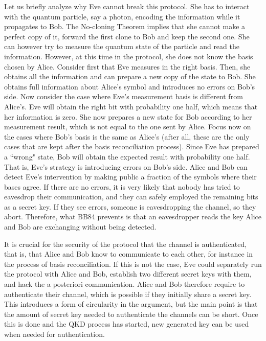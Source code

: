 \documentclass[a4paper]{article}
\begin{document}
Let us briefly analyze why Eve cannot break this protocol. She has
to interact with the quantum particle, say a photon, encoding the
information while it propagates to Bob. The No-cloning Theorem
implies that she cannot make a perfect copy of it, forward the
first clone to Bob and keep the second one. She can however try to
measure the quantum state of the particle and read the
information. However, at this time in the protocol, she does not
know the basis chosen by Alice. Consider first that Eve measures
in the right basis. Then, she obtains all the information and can
prepare a new copy of the state to Bob. She obtains full
information about Alice's symbol and introduces no errors on Bob's
side. Now consider the case where Eve's measurement basis is
different from Alice's. Eve will obtain the right bit with
probability one half, which means that her information is zero. She now prepares a new state for Bob according to her measurement result, 
which is not equal to the one sent by Alice. Focus now on the cases where Bob's basis is the
same as Alice's (after all, these are the only cases that are kept after the
basis reconciliation process). Since Eve has prepared a ``wrong"
state, Bob will obtain the expected result with probability one
half. That is, Eve's strategy is introducing errors on Bob's side.
Alice and Bob can detect Eve's intervention by making public a
fraction of the symbols where their bases agree. If there are no
errors, it is very likely that nobody has tried to eavesdrop their
communication, and they can safely employed the remaining bits as
a secret key. If they see errors,
someone is eavesdropping the channel, so they abort. Therefore,
what BB84 prevents is that an eavesdropper reads
the key Alice and Bob are exchanging without being
detected.

It is crucial for the security of the protocol that the channel is authenticated, that is, that Alice and Bob know to communicate to each other, for instance in the process of basis reconciliation. If this is not the case, Eve could separately run the protocol with Alice and Bob, establish two different secret keys with them, and hack the a posteriori communication. Alice and Bob therefore require to authenticate their channel, which is possible if they initially share a secret key. This introduces a form of circularity in the argument, but the main point is that the amount of secret key needed to authenticate the channels can be short. Once this is done and the QKD process has started, new generated key can be used when needed for authentication.
\end{document}
